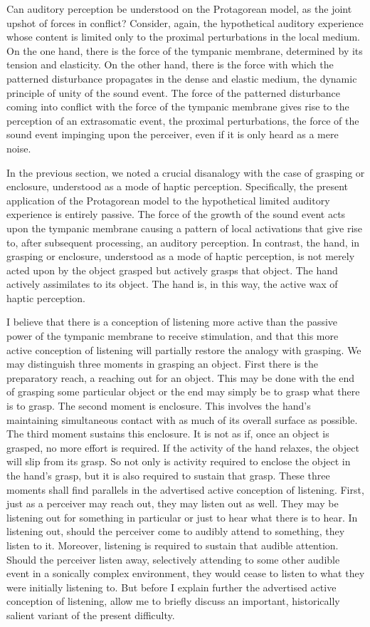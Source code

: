 Can auditory perception be understood on the Protagorean model, as the joint upshot of forces in conflict? Consider, again, the hypothetical auditory experience whose content is limited only to the proximal perturbations in the local medium. On the one hand, there is the force of the tympanic membrane, determined by its tension and elasticity. On the other hand, there is the force with which the patterned disturbance propagates in the dense and elastic medium, the dynamic principle of unity of the sound event. The force of the patterned disturbance coming into conflict with the force of the tympanic membrane gives rise to the perception of an extrasomatic event, the proximal perturbations, the force of the sound event impinging upon the perceiver, even if it is only heard as a mere noise.

In the previous section, we noted a crucial disanalogy with the case of grasping or enclosure, understood as a mode of haptic perception. Specifically, the present application of the Protagorean model to the hypothetical limited auditory experience is entirely passive. The force of the growth of the sound event acts upon the tympanic membrane causing a pattern of local activations that give rise to, after subsequent processing, an auditory perception. In contrast, the hand, in grasping or enclosure, understood as a mode of haptic perception, is not merely acted upon by the object grasped but actively grasps that object. The hand actively assimilates to its object. The hand is, in this way, the active wax of haptic perception.

I believe that there is a conception of listening more active than the passive power of the tympanic membrane to receive stimulation, and that this more active conception of listening will partially restore the analogy with grasping. We may distinguish three moments in grasping an object. First there is the preparatory reach, a reaching out for an object. This may be done with the end of grasping some particular object or the end may simply be to grasp what there is to grasp. The second moment is enclosure. This involves the hand's maintaining simultaneous contact with as much of its overall surface as possible. The third moment sustains this enclosure. It is not as if, once an object is grasped, no more effort is required. If the activity of the hand relaxes, the object will slip from its grasp. So not only is activity required to enclose the object in the hand's grasp, but it is also required to sustain that grasp. These three moments shall find parallels in the advertised active conception of listening. First, just as a perceiver may reach out, they may listen out as well. They may be listening out for something in particular or just to hear what there is to hear. In listening out, should the perceiver come to audibly attend to something, they listen to it. Moreover, listening is required to sustain that audible attention. Should the perceiver listen away, selectively attending to some other audible event in a sonically complex environment, they would cease to listen to what they were initially listening to. But before I explain further the advertised active conception of listening, allow me to briefly discuss an important, historically salient variant of the present difficulty.

